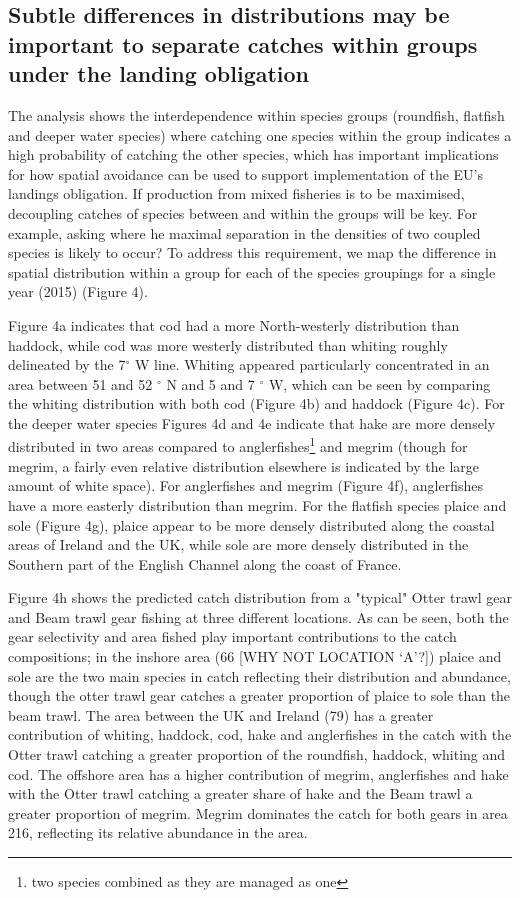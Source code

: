 \documentclass{nature}
\begin{document}
\begin{linenumbers}
\subsection{Subtle differences in distributions may be important to separate
	catches within groups under the landing obligation} 
The analysis shows the interdependence within species groups (roundfish,
flatfish and deeper water species) where catching one species within the group
indicates a high probability of catching the other species, which has important
implications for how spatial avoidance can be used to support implementation of
the EU's landings obligation. If production from mixed fisheries is to be maximised,
decoupling catches of species between and within the groups will be key. For example, asking where he maximal separation in the densities of two coupled species is likely to occur? To address this requirement, we map the difference in spatial distribution within a group for each
of the species groupings for a single year (2015) (Figure 4). 

Figure 4a indicates that cod had a more North-westerly distribution than
haddock, while cod was more westerly distributed than whiting roughly
delineated by the 7$^{\circ}$ W line. Whiting appeared particularly
concentrated in an area between 51 and 52 $^{\circ}$ N and 5 and 7 $^{\circ}$
W, which can be seen by comparing the whiting distribution with both cod
(Figure 4b) and haddock (Figure 4c). For the deeper water species Figures 4d
and 4e indicate that hake are more densely distributed in two areas compared to
anglerfishes\footnote{two species combined as they are managed as one} and
megrim (though for megrim, a fairly even relative distribution elsewhere is
indicated by the large amount of white space). For anglerfishes and megrim
(Figure 4f), anglerfishes have a more easterly distribution than megrim. For
the flatfish species plaice and sole (Figure 4g), plaice appear to be more
densely distributed along the coastal areas of Ireland and the UK, while sole
are more densely distributed in the Southern part of the English Channel along
the coast of France.

Figure 4h shows the predicted catch distribution from a "typical" Otter trawl
gear and Beam trawl gear fishing at three different locations. As can be seen,
both the gear selectivity and area fished play important contributions to the
catch compositions; in the inshore area (66 [WHY NOT LOCATION `A'?]) plaice and sole are the two main
species in catch reflecting their distribution and abundance, though the otter
trawl gear catches a greater proportion of plaice to sole than the beam trawl.
The area between the UK and Ireland (79) has a greater contribution of whiting,
haddock, cod, hake and anglerfishes in the catch with the Otter trawl catching
a greater proportion of the roundfish, haddock, whiting and cod. The offshore
area has a higher contribution of megrim, anglerfishes and hake with the Otter
trawl catching a greater share of hake and the Beam trawl a greater proportion
of megrim. Megrim dominates the catch for both gears in area 216, reflecting
its relative abundance in the area.


\end{linenumbers}
\end{document}
